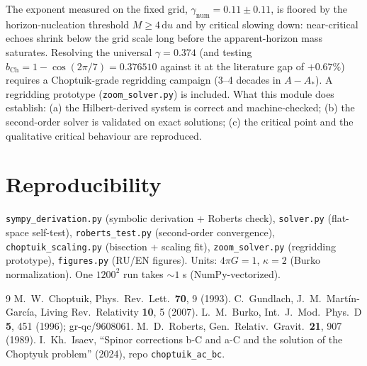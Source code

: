 \documentclass[11pt,a4paper]{article}
\begin{document}
\begin{tcolorbox}[colback=rowlight, colframe=linkblue,
title=Honest comparison with the framework constant]
The exponent measured on the fixed grid,
$\gamma_{\text{num}}=0.11\pm0.11$, is floored by the horizon-nucleation
threshold $M\ge4\,\mathrm{d}u$ and by critical slowing down: near-critical
echoes shrink below the grid scale long before the apparent-horizon mass
saturates. Resolving the universal $\gamma=0.374$ (and testing
$b_{\mathrm{Ch}}=1-\cos(2\pi/7)=0.376510$ against it at the literature gap of
$+0.67\%$) requires a Choptuik-grade regridding campaign (3--4 decades in
$A-A_*$). A regridding prototype (\texttt{zoom\_solver.py}) is included.
What this module does establish: (a) the Hilbert-derived system is correct and
machine-checked; (b) the second-order solver is validated on exact solutions;
(c) the critical point and the qualitative critical behaviour are reproduced.
\end{tcolorbox}

\section{Reproducibility}
\texttt{sympy\_derivation.py} (symbolic derivation + Roberts check),
\texttt{solver.py} (flat-space self-test),
\texttt{roberts\_test.py} (second-order convergence),
\texttt{choptuik\_scaling.py} (bisection + scaling fit),
\texttt{zoom\_solver.py} (regridding prototype),
\texttt{figures.py} (RU/EN figures). Units: $4\pi G=1$, $\kappa=2$ (Burko
normalization). One $1200^2$ run takes $\sim1$ s (NumPy-vectorized).

\begin{thebibliography}{9}
 M.~W.~Choptuik, Phys.\ Rev.\ Lett.\ \textbf{70}, 9 (1993).
 C.~Gundlach, J.~M.~Mart\'in-Garc\'ia, Living Rev.\ Relativity \textbf{10}, 5 (2007).
 L.~M.~Burko, Int.\ J.\ Mod.\ Phys.\ D \textbf{5}, 451 (1996); gr-qc/9608061.
 M.~D.~Roberts, Gen.\ Relativ.\ Gravit.\ \textbf{21}, 907 (1989).
 I.~Kh.~Isaev, ``Spinor corrections b-C and a-C and the solution of the Choptyuk problem'' (2024), repo \texttt{choptuik\_ac\_bc}.
\end{thebibliography}
\end{document}

